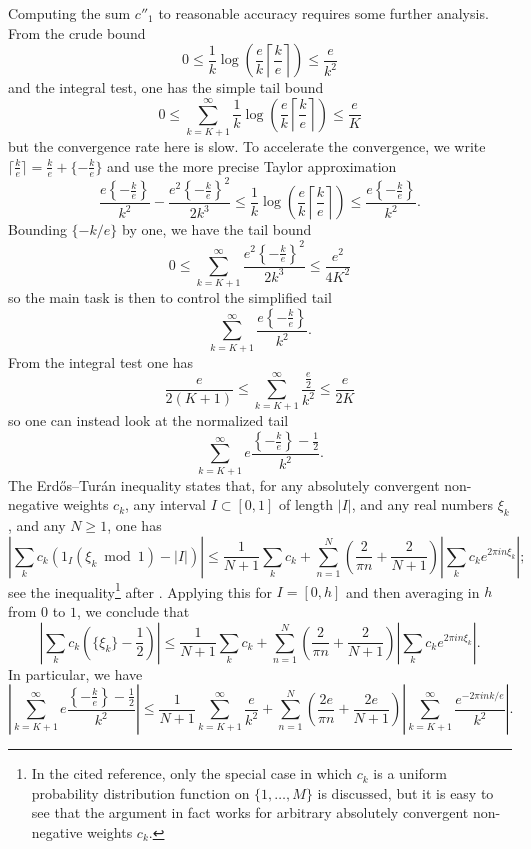 \documentclass[12pt,a4paper,reqno]{amsart}
\numberwithin{equation}{section}
\theoremstyle{plain}
\theoremstyle{definition}
\renewcommand{\mod}{\bmod}
\begin{document}
Computing the sum $c''_1$ to reasonable accuracy requires some further analysis.  From the crude bound
$$0 \leq \frac{1}{k} \log\left(\frac{e}{k} \left\lceil \frac{k}{e} \right\rceil\right) \leq \frac{e}{k^2}$$
and the integral test, one has the simple tail bound
$$ 0 \leq \sum_{k=K+1}^\infty \frac{1}{k} \log\left(\frac{e}{k} \left\lceil \frac{k}{e} \right\rceil\right) \leq \frac{e}{K}$$
but the convergence rate here is slow.  To accelerate the convergence, we write $\lceil\frac{k}{e} \rceil = \frac{k}{e} + \{-\frac{k}{e}\}$ and use the more precise Taylor approximation
$$ \frac{e \left\{-\frac{k}{e}\right\}}{k^2} - \frac{e^2 \left\{-\frac{k}{e}\right\}^2}{2k^3} 
\leq \frac{1}{k} \log\left(\frac{e}{k} \left\lceil \frac{k}{e} \right\rceil\right) \leq \frac{e \left\{-\frac{k}{e}\right\}}{k^2}.$$
Bounding $\{-k/e\}$ by one, we have the tail bound
$$ 0 \leq \sum_{k=K+1}^\infty \frac{e^2 \left\{-\frac{k}{e}\right\}^2}{2k^3} \leq \frac{e^2}{4K^2}$$
so the main task is then to control the simplified tail
$$ \sum_{k=K+1}^\infty \frac{e\left\{-\frac{k}{e}\right\}}{k^2}.$$
From the integral test one has
$$ \frac{e}{2(K+1)} \leq \sum_{k=K+1}^\infty \frac{\frac{e}{2}}{k^2} \leq \frac{e}{2K}$$
so one can instead look at the normalized tail
$$ \sum_{k=K+1}^\infty e\frac{\left\{-\frac{k}{e}\right\}-\frac{1}{2}}{k^2}.$$
The Erd\H{o}s--Tur\'an inequality states that, for any absolutely convergent non-negative weights $c_k$, any interval $I \subset [0,1]$ of length $|I|$, and any real numbers $\xi_k$, and any $N \geq 1$, one has
$$ \left|\sum_k c_k (1_I(\xi_k \mod 1) - |I|)\right| \leq \frac{1}{N+1} \sum_k c_k + \sum_{n=1}^N \left(\frac{2}{\pi n} + \frac{2}{N+1}\right) \left|\sum_k c_k e^{2\pi i n \xi_k}\right|;$$
see the inequality\footnote{In the cited reference, only the special case in which $c_k$ is a uniform probability distribution function on $\{1,\dots,M\}$ is discussed, but it is easy to see that the argument in fact works for arbitrary absolutely convergent non-negative weights $c_k$.} after \cite[Theorem 20]{vaaler}.  Applying this for $I = [0,h]$ and then averaging in $h$ from $0$ to $1$, we conclude that
$$ \left|\sum_k c_k \left(\{\xi_k\}-\frac{1}{2}\right)\right| \leq \frac{1}{N+1} \sum_k c_k + \sum_{n=1}^N \left(\frac{2}{\pi n} + \frac{2}{N+1}\right) \left|\sum_k c_k e^{2\pi i n \xi_k}\right|.$$
In particular, we have
$$ \left| \sum_{k=K+1}^\infty e\frac{\left\{-\frac{k}{e}\right\}-\frac{1}{2}}{k^2}\right| \leq \frac{1}{N+1} \sum_{k=K+1}^\infty \frac{e}{k^2}
+ \sum_{n=1}^N \left(\frac{2e}{\pi n} + \frac{2e}{N+1}\right) \left|\sum_{k=K+1}^\infty \frac{e^{-2\pi i n k/e}}{k^2}\right|.
$$
\end{document}

